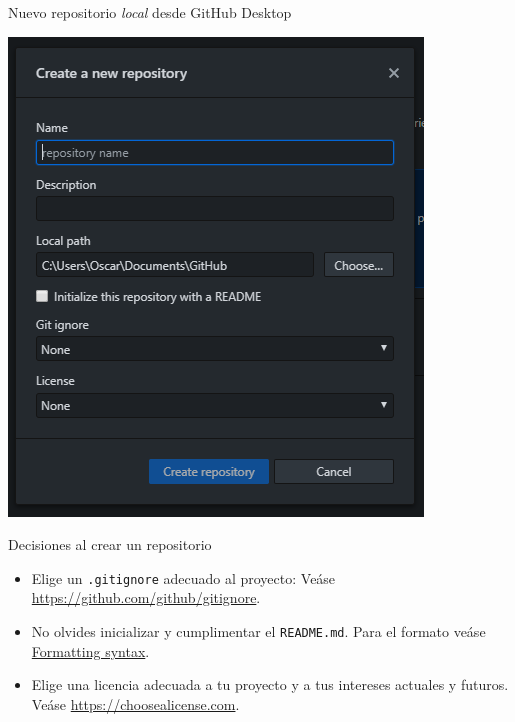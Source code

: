 \documentclass[xcolor={usenames,svgnames,dvipsnames}]{beamer}
\begin{document}
\begin{frame}[label={sec:org8fbbf64}]{Nuevo repositorio \emph{local} desde GitHub Desktop}
\begin{center}
\end{center}

\begin{center}
\includegraphics[height=0.7\textheight]{figs/Desktop_NewRepository.png}
\end{center}
\end{frame}

\begin{frame}[label={sec:orgef70bcc},fragile]{Decisiones al crear un repositorio}
 \begin{itemize}
\item Elige un \alert{\texttt{.gitignore}} adecuado al proyecto: Veáse \url{https://github.com/github/gitignore}.
\item No olvides inicializar y cumplimentar el \alert{\texttt{README.md}}. Para el formato veáse \href{https://help.github.com/articles/basic-writing-and-formatting-syntax/}{Formatting syntax}.
\item Elige una \alert{licencia} adecuada a tu proyecto y a tus intereses actuales y futuros. Veáse \url{https://choosealicense.com}.
\end{itemize}
\end{frame}
\end{document}
